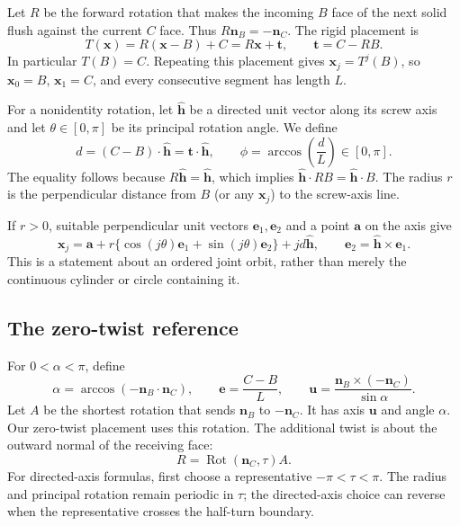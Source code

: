 \documentclass[11pt]{article}
\theoremstyle{definition}
\newcommand{\nb}{\mathbf n_B}
\newcommand{\nc}{\mathbf n_C}
\newcommand{\ee}{\mathbf e}
\newcommand{\uu}{\mathbf u}
\newcommand{\hh}{\widehat{\mathbf h}}
\newcommand{\Rot}{\operatorname{Rot}}
\begin{document}
Let $R$ be the forward rotation that makes the incoming $B$ face of the next
solid flush against the current $C$ face. Thus $R\nb=-\nc$. The rigid
placement is
\begin{equation}\label{eq:placement}
 T(\mathbf x)=R(\mathbf x-B)+C
            =R\mathbf x+\mathbf t,\qquad \mathbf t=C-RB.
\end{equation}
In particular $T(B)=C$. Repeating this placement gives
$\mathbf x_j=T^j(B)$, so $\mathbf x_0=B$, $\mathbf x_1=C$, and every
consecutive segment has length $L$.

For a nonidentity rotation, let $\hh$ be a directed unit vector along its
screw axis and let $\theta\in[0,\pi]$ be its principal rotation angle. We
define
\begin{equation}\label{eq:dphi}
 d=(C-B)\cdot\hh=\mathbf t\cdot\hh,
 \qquad \phi=\arccos\!\left(\frac dL\right)\in[0,\pi].
\end{equation}
The equality follows because $R\hh=\hh$, which implies
$\hh\cdot RB=\hh\cdot B$. The radius $r$ is the perpendicular distance
from $B$ (or any $\mathbf x_j$) to the screw-axis line.

If $r>0$, suitable perpendicular unit vectors $\mathbf e_1,\mathbf e_2$ and
a point $\mathbf a$ on the axis give
\begin{equation}\label{eq:orbit}
 \mathbf x_j=\mathbf a+
 r\{\cos(j\theta)\mathbf e_1+\sin(j\theta)\mathbf e_2\}
 +jd\hh,
 \qquad \mathbf e_2=\hh\times\mathbf e_1.
\end{equation}
This is a statement about an ordered joint orbit, rather than merely the
continuous cylinder or circle containing it.

\subsection{The zero-twist reference}\label{sec:reference}
For $0<\alpha<\pi$, define
\begin{equation}\label{eq:alphaeu}
 \alpha=\arccos(-\nb\cdot\nc),\qquad
 \ee=\frac{C-B}{L},\qquad
 \uu=\frac{\nb\times(-\nc)}{\sin\alpha}.
\end{equation}
Let $A$ be the shortest rotation that sends $\nb$ to $-\nc$. It has axis
$\uu$ and angle $\alpha$. Our zero-twist placement uses this rotation.
The additional twist is about the outward normal of the receiving face:
\begin{equation}\label{eq:composition}
 R=\Rot(\nc,\tau)A.
\end{equation}
For directed-axis formulas, first choose a representative
$-\pi<\tau<\pi$. The radius and principal rotation remain periodic in
$\tau$; the directed-axis choice can reverse when the representative crosses
the half-turn boundary.
\end{document}
